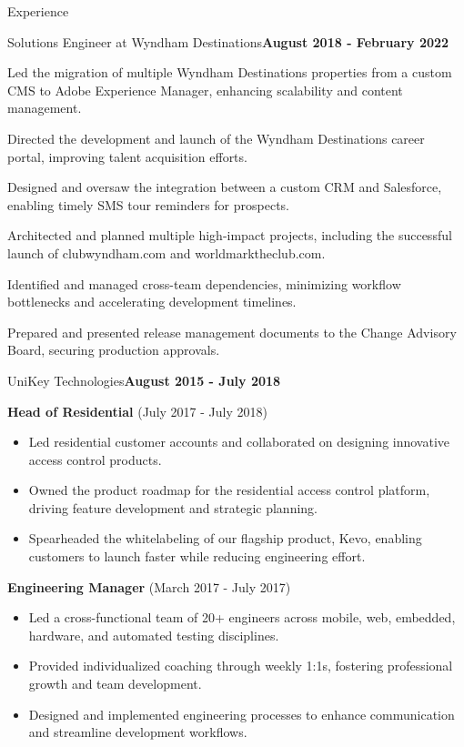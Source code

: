 \documentclass{resume} %
\begin{document}
\begin{rSection}{Experience}
\begin{rSubsection}{Solutions Engineer at Wyndham Destinations}{\bf August 2018 - February 2022}{}{}
    \item Led the migration of multiple Wyndham Destinations properties from a custom CMS to Adobe Experience Manager, enhancing scalability and content management.  
    \item Directed the development and launch of the Wyndham Destinations career portal, improving talent acquisition efforts.  
    \item Designed and oversaw the integration between a custom CRM and Salesforce, enabling timely SMS tour reminders for prospects.  
    \item Architected and planned multiple high-impact projects, including the successful launch of clubwyndham.com and worldmarktheclub.com.  
    \item Identified and managed cross-team dependencies, minimizing workflow bottlenecks and accelerating development timelines.  
    \item Prepared and presented release management documents to the Change Advisory Board, securing production approvals.  

    \end{rSubsection}




    \begin{rSubsection}{UniKey Technologies}{\bf August 2015 - July 2018}{}{}

        \item {\bf Head of Residential} (July 2017 - July 2018)  
        \begin{itemize}
            \item Led residential customer accounts and collaborated on designing innovative access control products.  
            \item Owned the product roadmap for the residential access control platform, driving feature development and strategic planning.  
            \item Spearheaded the whitelabeling of our flagship product, Kevo, enabling customers to launch faster while reducing engineering effort. 
        \end{itemize}

        \item {\bf Engineering Manager} (March 2017 - July 2017)  
        \begin{itemize}
            \item Led a cross-functional team of 20+ engineers across mobile, web, embedded, hardware, and automated testing disciplines.  
            \item Provided individualized coaching through weekly 1:1s, fostering professional growth and team development.  
            \item Designed and implemented engineering processes to enhance communication and streamline development workflows.  
        \end{itemize}


\end{rSubsection}
\end{rSection}
\end{document}
